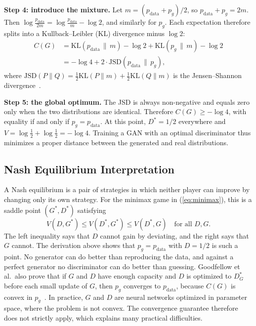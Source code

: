 \documentclass[conference]{IEEEtran}
\newcommand{\pdata}{p_{\mathrm{data}}}
\newcommand{\KL}{\mathrm{KL}}
\newcommand{\JSD}{\mathrm{JSD}}
\begin{document}
\textbf{Step 4: introduce the mixture.} Let $m=(\pdata+p_g)/2$, so $\pdata+p_g=2m$. Then $\log\frac{\pdata}{2m}=\log\frac{\pdata}{m}-\log2$, and similarly for $p_g$. Each expectation therefore splits into a Kullback--Leibler (KL) divergence minus $\log2$:
\begin{align}
C(G)&=\KL\!\left(\pdata\,\|\,m\right)-\log2+\KL\!\left(p_g\,\|\,m\right)-\log2\nonumber\\
&=-\log4+2\cdot\JSD\!\left(\pdata\,\|\,p_g\right),
\label{eq:jsd}
\end{align}
where $\JSD(P\|Q)=\frac12\KL(P\|m)+\frac12\KL(Q\|m)$ is the Jensen--Shannon divergence~\cite[Thm.~1]{goodfellow2014}.

\textbf{Step 5: the global optimum.} The JSD is always non-negative and equals zero only when the two distributions are identical. Therefore $C(G)\ge-\log4$, with equality if and only if $p_g=\pdata$. At this point, $D^*=1/2$ everywhere and $V=\log\frac12+\log\frac12=-\log4$. Training a GAN with an optimal discriminator thus minimizes a proper distance between the generated and real distributions.

\subsection{Nash Equilibrium Interpretation}
A Nash equilibrium is a pair of strategies in which neither player can improve by changing only its own strategy. For the minimax game in (\ref{eq:minimax}), this is a saddle point $(G^*,D^*)$ satisfying
\begin{equation}
V(D,G^*)\le V(D^*,G^*)\le V(D^*,G)\quad\text{for all }D,G.
\end{equation}
The left inequality says that $D$ cannot gain by deviating, and the right says that $G$ cannot. The derivation above shows that $p_g=\pdata$ with $D=1/2$ is such a point. No generator can do better than reproducing the data, and against a perfect generator no discriminator can do better than guessing. Goodfellow et al.\ also prove that if $G$ and $D$ have enough capacity and $D$ is optimized to $D^*_G$ before each small update of $G$, then $p_g$ converges to $\pdata$, because $C(G)$ is convex in $p_g$~\cite[Prop.~2]{goodfellow2014}. In practice, $G$ and $D$ are neural networks optimized in parameter space, where the problem is not convex. The convergence guarantee therefore does not strictly apply, which explains many practical difficulties.
\end{document}
